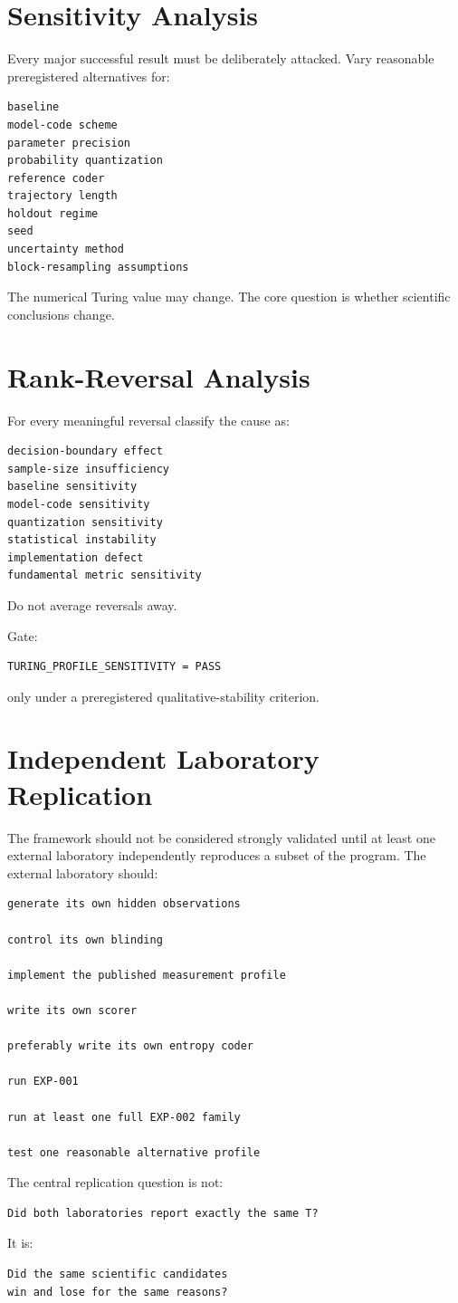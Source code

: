 \documentclass[11pt]{article}
\begin{document}
\section{Sensitivity Analysis}

Every major successful result must be deliberately attacked. Vary reasonable preregistered alternatives for:
\begin{verbatim}
baseline
model-code scheme
parameter precision
probability quantization
reference coder
trajectory length
holdout regime
seed
uncertainty method
block-resampling assumptions
\end{verbatim}
The numerical Turing value may change. The core question is whether scientific conclusions change.

\section{Rank-Reversal Analysis}

For every meaningful reversal classify the cause as:
\begin{verbatim}
decision-boundary effect
sample-size insufficiency
baseline sensitivity
model-code sensitivity
quantization sensitivity
statistical instability
implementation defect
fundamental metric sensitivity
\end{verbatim}
Do not average reversals away.

Gate:
\begin{verbatim}
TURING_PROFILE_SENSITIVITY = PASS
\end{verbatim}
only under a preregistered qualitative-stability criterion.

\section{Independent Laboratory Replication}

The framework should not be considered strongly validated until at least one external laboratory independently reproduces a subset of the program. The external laboratory should:
\begin{verbatim}
generate its own hidden observations

control its own blinding

implement the published measurement profile

write its own scorer

preferably write its own entropy coder

run EXP-001

run at least one full EXP-002 family

test one reasonable alternative profile
\end{verbatim}
The central replication question is not:
\begin{verbatim}
Did both laboratories report exactly the same T?
\end{verbatim}
It is:
\begin{verbatim}
Did the same scientific candidates
win and lose for the same reasons?
\end{verbatim}
\end{document}
